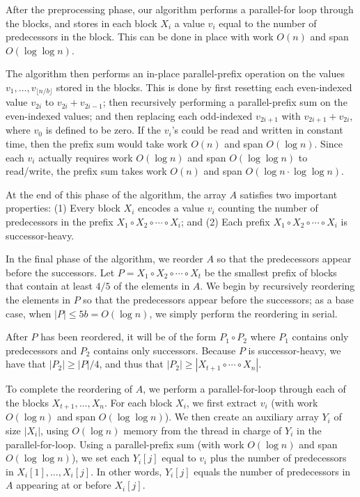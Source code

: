 \documentclass[sigplan, twocolumn]{amsart}
\renewcommand{\paragraph}[1]{\vspace{0.09in}\noindent{\bf \boldmath #1.}}
\theoremstyle{remark}
\theoremstyle{remark}
\begin{document}
After the preprocessing phase, our algorithm performs a parallel-for
loop through the blocks, and stores in each block $X_i$ a value $v_i$
equal to the number of predecessors in the block. This can be done
in place with work $O(n)$ and span $O(\log \log n)$.

The algorithm then performs an in-place parallel-prefix operation on
the values $v_1, \ldots, v_{\lfloor n / b \rfloor}$ stored in the
blocks. This is done by first resetting each even-indexed value
$v_{2i}$ to $v_{2i} + v_{2i - 1}$; then recursively performing a
parallel-prefix sum on the even-indexed values; and then replacing
each odd-indexed $v_{2i + 1}$ with $v_{2i + 1} + v_{2i}$, where $v_0$
is defined to be zero. If the $v_i$'s could be read and written in
constant time, then the prefix sum would take work $O(n)$
and span $O(\log n)$. Since each $v_i$ actually requires work $O(\log
n)$ and span $O(\log \log n)$ to read/write, the prefix sum takes work
$O(n)$ and span $O(\log n \cdot \log \log n)$.

At the end of this phase of the algorithm, the array $A$ satisfies two
important properties: (1) Every block $X_i$ encodes a value $v_i$
counting the number of predecessors in the prefix $X_1 \circ X_2 \circ
\cdots \circ X_i$; and (2) Each prefix $X_1 \circ X_2 \circ \cdots
\circ X_i$ is successor-heavy.

\paragraph{In-Place Reordering} In the final phase of the algorithm, we reorder $A$ so that the predecessors appear before the successors. Let $P = X_1 \circ X_2 \circ \cdots \circ X_t$ be the smallest prefix of blocks that contain at least $4/5$ of the elements in $A$. We begin by recursively reordering the elements in $P$ so that the predecessors appear before the successors; as a base case, when $|P| \le 5b = O(\log n)$, we simply perform the reordering in serial.

After $P$ has been reordered, it will be of the form $P_1
\circ P_2$ where $P_1$ contains only predecessors and $P_2$ contains
only successors. Because $P$ is successor-heavy, we have that $|P_2|
\ge |P| / 4$, and thus that $|P_2| \ge |X_{t + 1} \circ \cdots \circ
X_n|$.

To complete the reordering of $A$, we perform a parallel-for-loop
through each of the blocks $X_{t + 1}, \ldots, X_n$. For each block
$X_i$, we first extract $v_i$ (with work $O(\log n)$ and span $O(\log
\log n)$). We then create an auxiliary array $Y_i$ of size $|X_i|$,
using $O(\log n)$ memory from the thread in charge of $Y_i$ in the
parallel-for-loop. Using a parallel-prefix sum (with work $O(\log n)$
and span $O(\log \log n)$), we set each $Y_i[j]$ equal to $v_i$ plus
the number of predecessors in $X_i[1], \ldots, X_i[j]$. In other
words, $Y_i[j]$ equals the number of predecessors in $A$ appearing at
or before $X_i[j]$.
\end{document}
